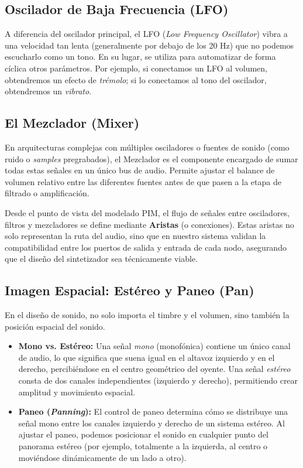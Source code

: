 \subsection{Oscilador de Baja Frecuencia (LFO)}
A diferencia del oscilador principal, el LFO (\textit{Low Frequency Oscillator}) vibra a una velocidad tan lenta (generalmente por debajo de los 20 Hz) que no podemos escucharlo como un tono. En su lugar, se utiliza para automatizar de forma cíclica otros parámetros. Por ejemplo, si conectamos un LFO al volumen, obtendremos un efecto de \textit{trémolo}; si lo conectamos al tono del oscilador, obtendremos un \textit{vibrato}.

\subsection{El Mezclador (Mixer)}
En arquitecturas complejas con múltiples osciladores o fuentes de sonido (como ruido o \textit{samples} pregrabados), el Mezclador es el componente encargado de sumar todas estas señales en un único bus de audio. Permite ajustar el balance de volumen relativo entre las diferentes fuentes antes de que pasen a la etapa de filtrado o amplificación.

Desde el punto de vista del modelado PIM, el flujo de señales entre osciladores, filtros y mezcladores se define mediante \textbf{Aristas} (o conexiones). Estas aristas no solo representan la ruta del audio, sino que en nuestro sistema validan la compatibilidad entre los puertos de salida y entrada de cada nodo, asegurando que el diseño del sintetizador sea técnicamente viable.

\subsection{Imagen Espacial: Estéreo y Paneo (Pan)}
En el diseño de sonido, no solo importa el timbre y el volumen, sino también la posición espacial del sonido. 
\begin{itemize}
    \item \textbf{Mono vs. Estéreo:} Una señal \textit{mono} (monofónica) contiene un único canal de audio, lo que significa que suena igual en el altavoz izquierdo y en el derecho, percibiéndose en el centro geométrico del oyente. Una señal \textit{estéreo} consta de dos canales independientes (izquierdo y derecho), permitiendo crear amplitud y movimiento espacial.
    \item \textbf{Paneo (\textit{Panning}):} El control de paneo determina cómo se distribuye una señal mono entre los canales izquierdo y derecho de un sistema estéreo. Al ajustar el paneo, podemos posicionar el sonido en cualquier punto del panorama estéreo (por ejemplo, totalmente a la izquierda, al centro o moviéndose dinámicamente de un lado a otro).
\end{itemize}

